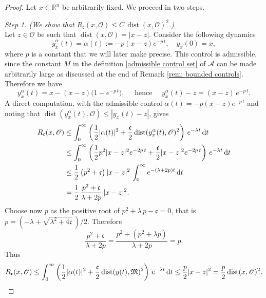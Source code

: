 \documentclass[12pt]{amsart}
\newcommand{\D}[1]{\mbox{\rm #1}}
\newcommand{\dd}{\D{d}}
\numberwithin{equation}{section}
\theoremstyle{plain}
\begin{document}
\begin{proof}
Let $x\in \mathbb{R}^{n}$ be arbitrarily fixed. We proceed in two steps.

\textit{Step 1. (We show that $R_{\mathfrak{c}}(x,\mathscr{O}) \leq C\,\operatorname{dist}(x,\mathscr{O})^{2}$.) } \\
Let $z\in \mathscr{O}$ be such that $\operatorname{dist}(x,\mathscr{O}) = |x-z|$.  Consider the following dynamics
\begin{equation*}
    \dot{y}_{x}^{\alpha}(t)=\alpha(t):=-p(x-z)e^{-p\,t},\quad y_{x}(0)=x,
\end{equation*}
where $p$ is a constant that we will later make precise. This control is admissible, since the constant $M$ in the definition \eqref{admissible control set} of $\mathcal{A}$ can be made arbitrarily large as discussed at the end of Remark \ref{rem: bounded controls}. Therefore we have
\begin{equation*}
    y_{x}^{\alpha}(t) = x - (x-z)\big(1-e^{-p\,t}\big), \quad \text{ hence }\quad 
    y_{x}^{\alpha}(t) - z = (x-z)\,e^{ -p\, t}. 
\end{equation*}
A direct computation, with the admissible control $\alpha(t) = -p(x-z)e^{-p\,t}$ and noting that $\operatorname{dist}(y_{x}^{\alpha}(t),\mathscr{O})\leq |y_{x}(t) - z|$, gives
\begin{equation*}
\begin{aligned} 
    R_{\mathfrak{c}}(x,\mathscr{O})
    & \leq \int_0^{\infty} \left(\frac{1}{2}|\alpha(t)|^2+\frac{\mathfrak{c}}{2}\operatorname{dist}(y_{x}^{\alpha}(t),\mathscr{O})^2\right)\,e^{-\lambda t}\, \dd t \\
    & \leq \int_0^\infty \left(\frac{1}{2} p^{2}|x-z|^{2}e^{-2p\,t}+\frac{\mathfrak{c}}{2}|x - z|^{2}e^{-2p\,t}\right) \,e^{-\lambda t}\, \dd t\\
    & \leq \frac{1}{2}\left(p^2+\mathfrak{c}\right)|x - z|^2 \,\int_0^\infty e^{-(\lambda+2p) t}\, \dd t\\
    & =\frac{1}{2} \,\frac{p^2+\mathfrak{c}}{\lambda+2 p} \, |x-z|^2.
\end{aligned}
\end{equation*}
Choose now $p$ as the positive root of $p^{2} + \lambda\,p - \mathfrak{c}=0$, that is $p = (-\lambda + \sqrt{\lambda^{2} + 4\mathfrak{c}}\,)/2$. Therefore 
\begin{equation*}
    \frac{p^2+\mathfrak{c}}{\lambda+2p}=\frac{p^2+\left(p^2+\lambda p\right)}{\lambda+2p}=p.
\end{equation*}
Thus
\begin{equation*}
    R_{\mathfrak{c}}(x,\mathscr{O}) \leq \int_0^\infty \left(\frac12|\alpha(t)|^2+\frac{\mathfrak{c}}{2}\operatorname{dist}(y(t),\mathfrak{M})^2\right)\,e^{-\lambda t}\,\dd t
    \leq\frac{p}{2}|x-z|^2
    = \frac{p}{2} \operatorname{dist}(x,\mathscr{O})^2.
\end{equation*}


\end{proof}
\end{document}

